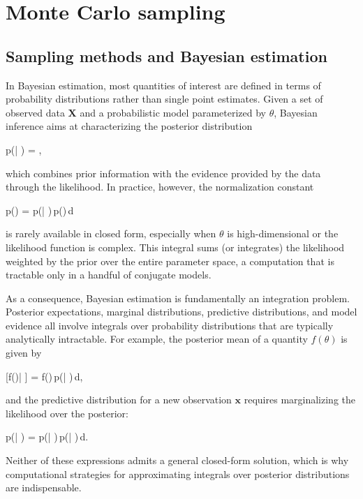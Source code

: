 
\chapter{Monte Carlo sampling}

\section*{Sampling methods and Bayesian estimation}

In Bayesian estimation, most quantities of interest are defined in terms of probability distributions rather than single point estimates. Given a set of observed data $\mathbf{X}$ and a probabilistic model parameterized by $\theta$, Bayesian inference aims at characterizing the posterior distribution
\begin{myequation}
p(\theta | ) = ,
\end{myequation}
which combines prior information with the evidence provided by the data through the likelihood. In practice, however, the normalization constant
\begin{myequation}
p() = \int p(| \theta)\,p(\theta)\,d\theta
\end{myequation}
is rarely available in closed form, especially when $\theta$ is high-dimensional or the likelihood function is complex. This integral sums (or integrates) the likelihood weighted by the prior over the entire parameter space, a computation that is tractable only in a handful of conjugate models.

As a consequence, Bayesian estimation is fundamentally an integration problem. Posterior expectations, marginal distributions, predictive distributions, and model evidence all involve integrals over probability distributions that are typically analytically intractable. For example, the posterior mean of a quantity $f(\theta)$ is given by
\begin{myequation}
[f(\theta)| ] = \int f(\theta)\,p(\theta| )\,d\theta,
\end{myequation}
and the predictive distribution for a new observation $\mathbf{x}$ requires marginalizing the likelihood over the posterior:
\begin{myequation}
p(| ) = \int p(| \theta)\,p(\theta| )\,d\theta.
\end{myequation}
Neither of these expressions admits a general closed-form solution, which is why computational strategies for approximating integrals over posterior distributions are indispensable.

